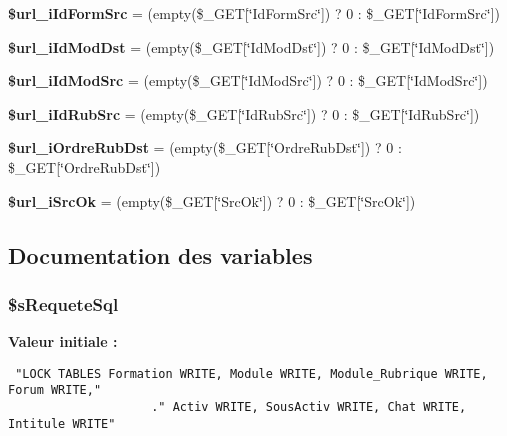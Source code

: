 \begin{CompactItemize}
\item 
\textbf{\$url\_\-iIdFormSrc} = (empty(\$\_\-GET[\char`\"{}IdFormSrc\char`\"{}]) ? 0 : \$\_\-GET[\char`\"{}IdFormSrc\char`\"{}])\label{copie__rub_8php_7d23b6d8e8be4b72aec972efac946e63}

\item 
\textbf{\$url\_\-iIdModDst} = (empty(\$\_\-GET[\char`\"{}IdModDst\char`\"{}]) ? 0 : \$\_\-GET[\char`\"{}IdModDst\char`\"{}])\label{copie__rub_8php_c41023b63574a7d174a663b4d124b1bc}

\item 
\textbf{\$url\_\-iIdModSrc} = (empty(\$\_\-GET[\char`\"{}IdModSrc\char`\"{}]) ? 0 : \$\_\-GET[\char`\"{}IdModSrc\char`\"{}])\label{copie__rub_8php_404de3ff18f4725fee13ab25d228dfd4}

\item 
\textbf{\$url\_\-iIdRubSrc} = (empty(\$\_\-GET[\char`\"{}IdRubSrc\char`\"{}]) ? 0 : \$\_\-GET[\char`\"{}IdRubSrc\char`\"{}])\label{copie__rub_8php_6f4b968c61928c1ec368acd93e89f7ef}

\item 
\textbf{\$url\_\-iOrdreRubDst} = (empty(\$\_\-GET[\char`\"{}OrdreRubDst\char`\"{}]) ? 0 : \$\_\-GET[\char`\"{}OrdreRubDst\char`\"{}])\label{copie__rub_8php_47d8b304be967ef2349ae4364b298328}

\item 
\textbf{\$url\_\-iSrcOk} = (empty(\$\_\-GET[\char`\"{}SrcOk\char`\"{}]) ? 0 : \$\_\-GET[\char`\"{}SrcOk\char`\"{}])\label{copie__rub_8php_b57149b16534096f0ca81cd8e78fa958}

\end{CompactItemize}


\subsection{Documentation des variables}
\subsubsection{\setlength{\rightskip}{0pt plus 5cm}\$sRequeteSql}\label{copie__rub_8php_7fd44c997b9477ef9cf33ccb4eb5545e}


\textbf{Valeur initiale :}

\begin{Code}\begin{verbatim} "LOCK TABLES Formation WRITE, Module WRITE, Module_Rubrique WRITE, Forum WRITE,"
                    ." Activ WRITE, SousActiv WRITE, Chat WRITE, Intitule WRITE"
\end{verbatim}
\end{Code}
